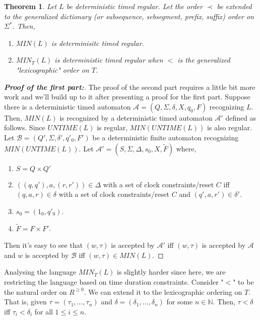 \documentclass[a4paper,12pt]{article}
\theoremstyle{break}
\newtheorem{theorem}{Theorem}[subsection]
\newcommand{\N}{\mathbb{N}}
\begin{document}
\begin{theorem}
    Let $L$ be deterministic timed regular. Let the order $\prec$ be extended to the generalized dictionary (or subsequence, sebsegment, prefix, suffix) order on $\Sigma^*$. Then, 
    
    \begin{enumerate}
        \item $MIN(L)$ is determinisitc timed regular.
        \item $MIN_T(L)$ is deterministic timed regular when $<$ is the generalized "lexicographic" order on $T$.
    \end{enumerate}
    
\end{theorem}
\begin{proof}[\textbf{Proof of the first part:}]

    The proof of the second part requires a little bit more work and we'll build up to it after presenting a proof for the first part.
    Suppose there is a deterministic timed automaton $\mathcal{A}=(Q,\Sigma,\delta, X, q_0, F)$ recognizing $L$. Then, $MIN(L)$ is recognized by a deterministic timed automaton $\mathcal{A}'$ defined as follows. Since $UNTIME(L)$ is regular, $MIN(UNTIME(L))$ is also regular. Let $\mathcal{B}=(Q',\Sigma,\delta', q'_0, F')$ be a deterministic finite automaton recognizing $MIN(UNTIME(L))$. Let $\mathcal{A}'=(S,\Sigma,\Delta,s_0,X,\tilde{F})$ where,

    \begin{enumerate}
        \item $S=Q\times Q'$
        \item $((q,q'),a,(r,r'))\in\Delta$ with a set of clock constraints/reset $C$ iff $(q,a,r)\in\delta$ with a set of clock constraints/reset $C$ and $(q',a,r')\in\delta'$.
        \item $s_0=(1_0,q'_0)$.
        \item $\tilde{F}=F\times F'$.
    \end{enumerate}

    Then it's easy to see that $(w,\tau)$ is accepted by $\mathcal{A}'$ iff $(w,\tau)$ is accepted by $\mathcal{A}$ and $w$ is accepted by $\mathcal{B}$ iff $(w,\tau)\in MIN(L)$.
\end{proof}

Analysing the language $MIN_T(L)$ is slightly harder since here, we are restricting the language based on time duration constraints. Consider "$<$" to be the natural order on $R^{\geq 0}$. We can extend it to the lexicographic ordering on $T$. That is, given $\tau=(\tau_1,\dots,\tau_n)$ and $\delta=(\delta_1,\dots,\delta_n)$ for some $n\in \N$. Then, $\tau<\delta$ iff $\tau_i < \delta_i$ for all $1\leq i \leq n$.\\
\end{document}
